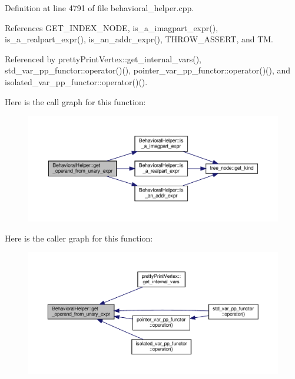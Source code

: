 Definition at line 4791 of file behavioral\+\_\+helper.\+cpp.



References G\+E\+T\+\_\+\+I\+N\+D\+E\+X\+\_\+\+N\+O\+DE, is\+\_\+a\+\_\+imagpart\+\_\+expr(), is\+\_\+a\+\_\+realpart\+\_\+expr(), is\+\_\+an\+\_\+addr\+\_\+expr(), T\+H\+R\+O\+W\+\_\+\+A\+S\+S\+E\+RT, and TM.



Referenced by pretty\+Print\+Vertex\+::get\+\_\+internal\+\_\+vars(), std\+\_\+var\+\_\+pp\+\_\+functor\+::operator()(), pointer\+\_\+var\+\_\+pp\+\_\+functor\+::operator()(), and isolated\+\_\+var\+\_\+pp\+\_\+functor\+::operator()().

Here is the call graph for this function\+:
\nopagebreak
\begin{figure}[H]
\begin{center}
\leavevmode
\includegraphics[width=350pt]{dd/db2/classBehavioralHelper_abc594fddf1e643e040bef82bb2814561_cgraph}
\end{center}
\end{figure}
Here is the caller graph for this function\+:
\nopagebreak
\begin{figure}[H]
\begin{center}
\leavevmode
\includegraphics[width=350pt]{dd/db2/classBehavioralHelper_abc594fddf1e643e040bef82bb2814561_icgraph}
\end{center}
\end{figure}
\mbox{\label{classBehavioralHelper_a610334c66bf0ac0813878674181ae8ce}} 
